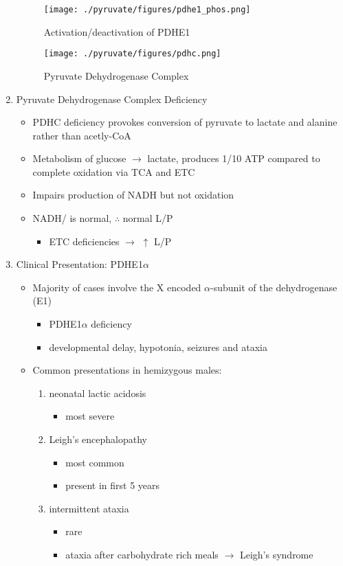 \documentclass{scrartcl}
\begin{document}
\begin{enumerate}
\begin{figure}[htbp]
\centering
\texttt{[image: ./pyruvate/figures/pdhe1\_phos.png]}
\caption[pdhe1]{\label{fig:orga07a115}
Activation/deactivation of PDHE1}
\end{figure}


\begin{figure}[htbp]
\centering
\texttt{[image: ./pyruvate/figures/pdhc.png]}
\caption[pdhc]{\label{fig:orgec97d36}
Pyruvate Dehydrogenase Complex}
\end{figure}

\item Pyruvate Dehydrogenase Complex Deficiency
\label{sec:org94b82d2}
\begin{itemize}
\item PDHC deficiency provokes conversion of pyruvate to lactate and alanine rather than acetly-CoA
\item Metabolism of glucose \(\to\) lactate, produces 1/10 ATP compared to
complete oxidation via TCA and ETC
\item Impairs production of NADH but not oxidation
\item NADH/ is normal, \(\therefore\) normal L/P
\begin{itemize}
\item ETC deficiencies \(\to\) \(\uparrow\) L/P
\end{itemize}
\end{itemize}

\item Clinical Presentation: PDHE1\(\alpha\)
\label{sec:orgbf6e8f0}
\begin{itemize}
\item Majority of cases involve the X encoded \(\alpha\)-subunit of the dehydrogenase (E1)
\begin{itemize}
\item PDHE1\(\alpha\) deficiency
\item developmental delay, hypotonia, seizures and ataxia
\end{itemize}

\item Common presentations in hemizygous males:
\begin{enumerate}
\item neonatal lactic acidosis
\begin{itemize}
\item most severe
\end{itemize}
\item Leigh's encephalopathy
\begin{itemize}
\item most common
\item present in first 5 years
\end{itemize}
\item intermittent ataxia
\begin{itemize}
\item rare
\item ataxia after carbohydrate rich meals \(\to\) Leigh's syndrome
\end{itemize}
\end{enumerate}


\end{itemize}
\end{enumerate}
\end{document}
